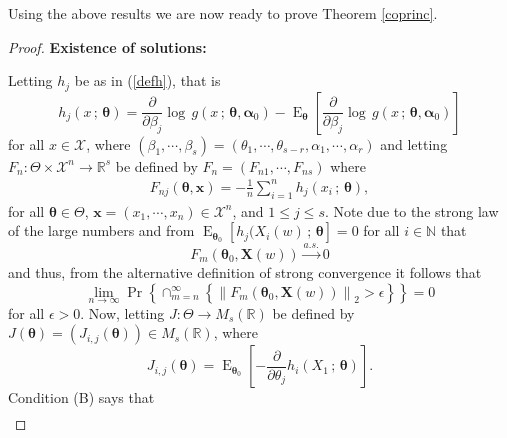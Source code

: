 \documentclass[lineno]{biometrika}
\newcommand{\f}{\operatorname}
\newcommand{\bs}{\boldsymbol}
\newcommand{\on}{\operatorname}
\begin{document}
\noindent Using the above results we are now ready to prove Theorem \ref{coprinc}.

\begin{proof} 

\noindent \textbf{ Existence of solutions:}
\vspace{0.3cm}

Letting $h_j$ be as in (\ref{defh}), that is
\begin{equation*}
h_j(x\,;\,\bs{\theta}) = \frac{\partial}{\partial \beta_j}\log\, g \left(x\,;\,\bs{\theta},\bs{\alpha}_0\right) - \on{E}_{\bs{\theta}}\left[\frac{\partial}{\partial \beta_j}\log\, g \left(x\,;\,\bs{\theta},\bs{\alpha}_0\right)\right]
\end{equation*}
for all $x\in \mathcal{X}$, where $(\beta_1,\cdots,\beta_s)=(\theta_1,\cdots,\theta_{s-r},\alpha_1,\cdots,\alpha_r)$ and letting $F_n:\Theta\times \mathcal{X}^n\to \mathbb{R}^s$ be defined by $F_n = \left(F_{n1},\cdots,F_{ns}\right)$ where
\begin{equation*}
\begin{aligned}F_{nj}(\bs{\theta},\bs{x})=-\frac{1}{n}\sum_{i=1}^n h_j \left(x_i\,;\,\bs{\theta}\right),
\end{aligned}
\end{equation*}
for all $\bs{\theta}\in \Theta$, $\bs{x}=(x_1,\cdots,x_n)\in \mathcal{X}^n$, and $1\leq j\leq s$. Note due to the strong law of the large numbers and from $\on{E}_{\bs{\theta}_0}\left[h_j(X_i(w)\, ;\, \bs{\theta} \right] = 0$ for all $i\in \mathbb{N}$ that
\begin{equation*} F_m(\bs{\theta}_0,\bs{X}(w))\overset{a.s.}{\to} 0
\end{equation*}
and thus, from the alternative definition of strong convergence it follows that
\begin{equation}\label{weak} \lim_{n\to \infty} \f{Pr}\left\{\cap_{m=n}^\infty\left\{\left\|F_{m}(\bs{\theta}_0,\bs{X}(w))\right\|_2>\epsilon\right\}\right\} = 0
\end{equation}
for all $\epsilon>0$. Now, letting $J:\Theta\to M_s(\mathbb{R})$ be defined by $J(\bs{\theta})=\left(J_{i,j}(\bs{\theta})\right)\in M_s(\mathbb{R})$, where
\begin{equation*}J_{i,j}(\bs{\theta})=
 \on{E}_{\bs{\theta}_0} \left[-\frac{\partial}{\partial\theta_j}h_i(X_1\, ;\, \bs{\theta})\right].
\end{equation*}
Condition (B) says that
\begin{equation}\label{conditionC}
 \begin{aligned}

\end{aligned}
\end{equation}
\end{proof}
\end{document}
